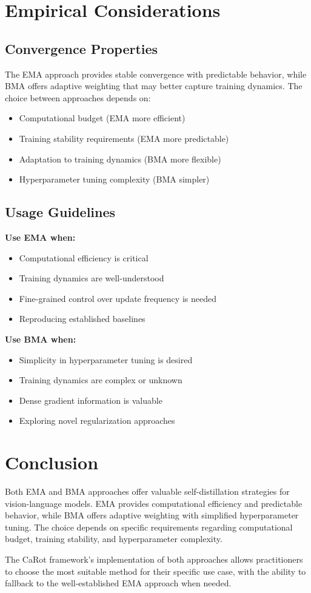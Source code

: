 \documentclass[11pt]{article}
\begin{document}
\section{Empirical Considerations}

\subsection{Convergence Properties}

The EMA approach provides stable convergence with predictable behavior, while BMA offers adaptive weighting that may better capture training dynamics. The choice between approaches depends on:

\begin{itemize}
\item Computational budget (EMA more efficient)
\item Training stability requirements (EMA more predictable)
\item Adaptation to training dynamics (BMA more flexible)
\item Hyperparameter tuning complexity (BMA simpler)
\end{itemize}

\subsection{Usage Guidelines}

\textbf{Use EMA when:}
\begin{itemize}
\item Computational efficiency is critical
\item Training dynamics are well-understood
\item Fine-grained control over update frequency is needed
\item Reproducing established baselines
\end{itemize}

\textbf{Use BMA when:}
\begin{itemize}
\item Simplicity in hyperparameter tuning is desired
\item Training dynamics are complex or unknown
\item Dense gradient information is valuable
\item Exploring novel regularization approaches
\end{itemize}

\section{Conclusion}

Both EMA and BMA approaches offer valuable self-distillation strategies for vision-language models. EMA provides computational efficiency and predictable behavior, while BMA offers adaptive weighting with simplified hyperparameter tuning. The choice depends on specific requirements regarding computational budget, training stability, and hyperparameter complexity.

The CaRot framework's implementation of both approaches allows practitioners to choose the most suitable method for their specific use case, with the ability to fallback to the well-established EMA approach when needed.
\end{document}
